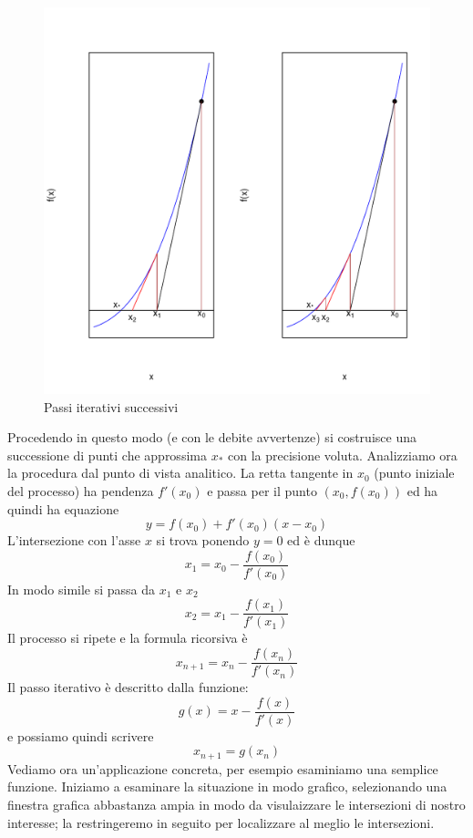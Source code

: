 \documentclass[onecolumn,11pt]{book}\usepackage[]{graphicx}\usepackage[]{color}
\makeatletter
\def\maxwidth{ %
  \ifdim\Gin@nat@width>\linewidth
    \linewidth
  \else
    \Gin@nat@width
  \fi
}
\newenvironment{knitrout}{}{} %
\makeatother
\begin{document}
\begin{figure}\begin{center}
\begin{knitrout}
\color{fgcolor}
\includegraphics[width=\maxwidth]{figure/step1-1} 

\end{knitrout}
\caption{Passi iterativi successivi}
\label{fig:newton2}
\end{center}
\end{figure}
Procedendo in questo modo (e con le debite avvertenze) si costruisce una successione di punti che approssima $x_*$ con la precisione voluta.
Analizziamo ora la procedura dal punto di vista analitico. La retta tangente in $x_0$ (punto iniziale del processo) ha pendenza $f'(x_0)$ e passa per il punto $(x_0,f(x_0))$ ed ha quindi ha equazione
\[ y=f(x_0)+f'(x_0)(x-x_0)\]
L'intersezione con l'asse $x$ si trova ponendo $y=0$ ed \`e dunque
\[x_1=x_0-\dfrac{f(x_0)}{f'(x_0)}\]
In modo simile si passa da $x_1$ e $x_2$
\[x_2=x_1-\dfrac{f(x_1)}{f'(x_1)}\]
Il processo si ripete e la formula ricorsiva \`e
\[x_{n+1}=x_n-\dfrac{f(x_n)}{f'(x_n)}\]
Il passo iterativo \`e descritto dalla funzione:
\[g(x)=x-\dfrac{f(x)}{f'(x)}\]
e possiamo quindi scrivere
\[x_{n+1}=g(x_n)\]
Vediamo ora un'applicazione concreta, per esempio esaminiamo una semplice funzione. Iniziamo a esaminare la situazione in modo grafico,  selezionando una finestra grafica abbastanza ampia in modo da visulaizzare le intersezioni di nostro interesse; la restringeremo in seguito per localizzare al meglio le intersezioni.
\end{document}
